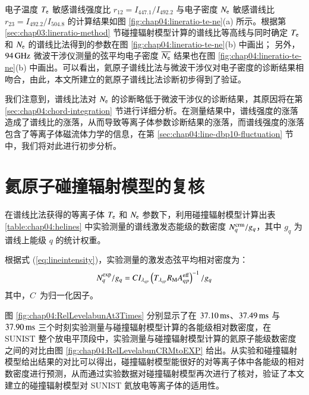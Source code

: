 电子温度 $T_{\rm e}$ 敏感谱线强度比 $r_{12}=I_{447.1}/I_{492.2}$ 与电子密度 $N_{\rm e}$ 敏感谱线比 $r_{23}=I_{492.2}/I_{504.8}$ 的计算结果如图 \ref{fig:chap04:lineratio-te-ne}(a) 所示。根据第 \ref{sec:chap03:lineratio-method} 节碰撞辐射模型计算的谱线比等高线与同时确定 $T_{\rm e}$ 和 $N_{\rm e}$ 的谱线比法得到的参数在图 \ref{fig:chap04:lineratio-te-ne}(b) 中画出；%
另外， $94\,{\rm GHz}$ 微波干涉仪测量的弦平均电子密度 $\overline{N_{\rm e}}$ 结果也在图 \ref{fig:chap04:lineratio-te-ne}(b) 中画出。可以看出，氦原子谱线比法与微波干涉仪对电子密度的诊断结果相吻合，由此，本文所建立的氦原子谱线比法诊断初步得到了验证。

我们注意到，谱线比法对 $N_{\rm e}$ 的诊断略低于微波干涉仪的诊断结果，其原因将在第 \ref{sec:chap04:chord-integration} 节进行详细分析。在测量结果中，谱线强度的涨落造成了谱线比的涨落，从而导致等离子体参数诊断结果的涨落，而谱线强度的涨落包含了等离子体磁流体力学的信息，在第 \ref{sec:chap04:line-dbp10-fluctuation} 节中，我们将对此进行初步分析。

\section{氦原子碰撞辐射模型的复核}
\label{sec:chap04:rel-levelabun-crm-to-exp}

在谱线比法获得的等离子体 $T_{\rm e}$ 和 $N_{\rm e}$ 参数下，利用碰撞辐射模型计算出表 \ref{table:chap04:helines} 中实验测量的谱线激发态能级的数密度 $N_q^{\rm crm}/g_q$，其中 $g_q$ 为谱线上能级 $q$ 的统计权重。

根据式 (\ref{eq:lineintensity})，实验测量的激发态弦平均相对密度为：
\begin{eqnarray}
N_q^{\rm exp}/g_q=CI_{\lambda_{qp}}\left(T_{\lambda_{qp}}R_{\rm M}A_{qp}^{\rm eff}\right)^{-1}/g_q
\end{eqnarray}
其中，$C$~为归一化因子。

图 \ref{fig:chap04:RelLevelabunAt3Times} 分别显示了在 $37.10\,{\rm ms}$、$37.49\,{\rm ms}$ 与 $37.90\,{\rm ms}$ 三个时刻实验测量与碰撞辐射模型计算的各能级相对数密度，在 SUNIST 整个放电平顶段中，实验测量与碰撞辐射模型计算的氦原子能级数密度之间的对比由图 \ref{fig:chap04:RelLevelabunCRMtoEXP} 给出。从实验和碰撞辐射模型给出结果的对比可以得出，碰撞辐射模型能很好的对等离子体中各能级的相对数密度进行预测，从而通过实验数据对碰撞辐射模型再次进行了核对，验证了本文建立的碰撞辐射模型对 SUNIST 氦放电等离子体的适用性。

